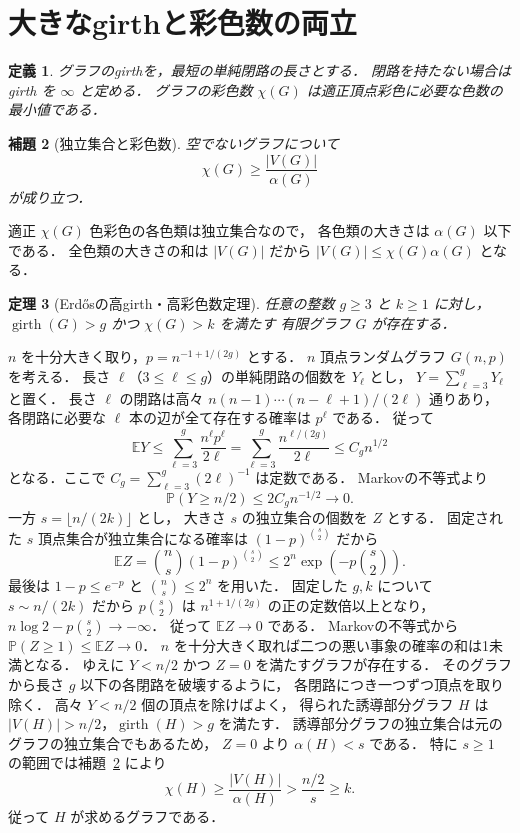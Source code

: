 \documentclass[a5paper,10pt,onecolumn]{jsarticle}
\makeatletter
\theoremstyle{mathnotetheorem}
\newtheorem{theorem}{定理}[section]
\newtheorem{definition}[theorem]{定義}
\newtheorem{lemma}[theorem]{補題}
\renewcommand{\proofname}{証明}
\renewenvironment{proof}[1][\proofname]{%
  \par\pushQED{\qed}\normalfont\topsep4\p@\@plus2\p@\relax
  \trivlist\item[\hskip\labelsep\bfseries #1]\ignorespaces
}{\popQED\endtrivlist\@endpefalse}
\makeatother
\begin{document}
\section{大きなgirthと彩色数の両立}
\begin{definition}
グラフの\emph{girth}を，最短の単純閉路の長さとする．
閉路を持たない場合は girth を $\infty$ と定める．
グラフの\emph{彩色数} $\chi(G)$ は適正頂点彩色に必要な色数の最小値である．
\end{definition}

\begin{lemma}[独立集合と彩色数]\label{lem:chiind}
空でないグラフについて
\[
 \chi(G)\ge\frac{|V(G)|}{\alpha(G)}
\]
が成り立つ．
\end{lemma}
\begin{proof}
適正 $\chi(G)$ 色彩色の各色類は独立集合なので，
各色類の大きさは $\alpha(G)$ 以下である．
全色類の大きさの和は $|V(G)|$ だから
$|V(G)|\le\chi(G)\alpha(G)$ となる．
\end{proof}

\begin{theorem}[Erd\H{o}sの高girth・高彩色数定理]\label{thm:erdosgirth}
任意の整数 $g\ge3$ と $k\ge1$ に対し，
$\operatorname{girth}(G)>g$ かつ $\chi(G)>k$ を満たす
有限グラフ $G$ が存在する．
\end{theorem}
\begin{proof}
$n$ を十分大きく取り，$p=n^{-1+1/(2g)}$ とする．
$n$ 頂点ランダムグラフ $G(n,p)$ を考える．
長さ $\ell$（$3\le\ell\le g$）の単純閉路の個数を $Y_\ell$ とし，
$Y=\sum_{\ell=3}^gY_\ell$ と置く．
長さ $\ell$ の閉路は高々
$n(n-1)\cdots(n-\ell+1)/(2\ell)$ 通りあり，
各閉路に必要な $\ell$ 本の辺が全て存在する確率は $p^\ell$ である．
従って
\[
 \mathbb EY
 \le\sum_{\ell=3}^g\frac{n^\ell p^\ell}{2\ell}
 =\sum_{\ell=3}^g\frac{n^{\ell/(2g)}}{2\ell}
 \le C_g n^{1/2}
\]
となる．ここで $C_g=\sum_{\ell=3}^g(2\ell)^{-1}$ は定数である．
Markovの不等式より
\[
 \mathbb P(Y\ge n/2)\le 2C_gn^{-1/2}\longrightarrow0.
\]
一方 $s=\lfloor n/(2k)\rfloor$ とし，
大きさ $s$ の独立集合の個数を $Z$ とする．
固定された $s$ 頂点集合が独立集合になる確率は
$(1-p)^{{s\choose2}}$ だから
\[
 \mathbb EZ={n\choose s}(1-p)^{{s\choose2}}
 \le2^n\exp\left(-p{s\choose2}\right).
\]
最後は $1-p\le e^{-p}$ と ${n\choose s}\le2^n$ を用いた．
固定した $g,k$ について $s\sim n/(2k)$ だから
$ p{s\choose2}$ は $n^{1+1/(2g)}$ の正の定数倍以上となり，
$n\log2-p{s\choose2}\to-\infty$．
従って $\mathbb EZ\to0$ である．
Markovの不等式から $\mathbb P(Z\ge1)\le\mathbb EZ\to0$．
$n$ を十分大きく取れば二つの悪い事象の確率の和は1未満となる．
ゆえに $Y<n/2$ かつ $Z=0$ を満たすグラフが存在する．
そのグラフから長さ $g$ 以下の各閉路を破壊するように，
各閉路につき一つずつ頂点を取り除く．
高々 $Y<n/2$ 個の頂点を除けばよく，
得られた誘導部分グラフ $H$ は
$|V(H)|>n/2$，$\operatorname{girth}(H)>g$ を満たす．
誘導部分グラフの独立集合は元のグラフの独立集合でもあるため，
$Z=0$ より $\alpha(H)<s$ である．
特に $s\ge1$ の範囲では補題~\ref{lem:chiind} により
\[
 \chi(H)\ge\frac{|V(H)|}{\alpha(H)}
 >\frac{n/2}{s}\ge k.
\]
従って $H$ が求めるグラフである．
\end{proof}
\end{document}
